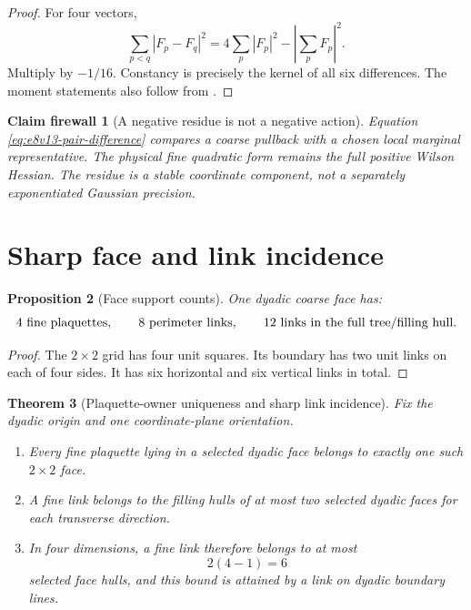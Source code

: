 \documentclass[11pt,oneside]{book}
\newtheorem{theorem}{Theorem}[chapter]
\newtheorem{proposition}[theorem]{Proposition}
\newtheorem{firewall}[theorem]{Claim firewall}
\theoremstyle{definition}
\theoremstyle{remark}
\begin{document}
\begin{proof}
For four vectors,
\[
 \sum_{p<q}|F_p-F_q|^2
 =4\sum_p|F_p|^2-\left|\sum_pF_p\right|^2.
\]
Multiply by \(-1/16\).  Constancy is precisely the kernel of all six
differences.  The moment statements also follow from
.
\end{proof}

\begin{firewall}[A negative residue is not a negative action]
\label{fire:e8v13-negative}
Equation \eqref{eq:e8v13-pair-difference} compares a coarse pullback
with a chosen local marginal representative.  The physical fine
quadratic form remains the full positive Wilson Hessian.  The residue
is a stable coordinate component, not a separately exponentiated
Gaussian precision.
\end{firewall}

\section{Sharp face and link incidence}
\label{sec:e8v13-incidence}

\begin{proposition}[Face support counts]
\label{prop:e8v13-face-counts}
One dyadic coarse face has:
\[
 4\ \hbox{fine plaquettes},\qquad
 8\ \hbox{perimeter links},\qquad
 12\ \hbox{links in the full tree/filling hull}.    \label{eq:e8v13-face-counts}
\]
\end{proposition}

\begin{proof}
The \(2\times2\) grid has four unit squares.  Its boundary has two
unit links on each of four sides.  It has six horizontal and six
vertical links in total.
\end{proof}

\begin{theorem}[Plaquette-owner uniqueness and sharp link incidence]
\label{thm:e8v13-incidence}
Fix the dyadic origin and one coordinate-plane orientation.
\begin{enumerate}[label=\textup{(\roman*)},leftmargin=3.5em]
\item Every fine plaquette lying in a selected dyadic face belongs to
      exactly one such \(2\times2\) face.
\item A fine link belongs to the filling hulls of at most two selected
      dyadic faces for each transverse direction.
\item In four dimensions, a fine link therefore belongs to at most
      \[
      2(4-1)=6                                      \label{eq:e8v13-link-six}
      \]
      selected face hulls, and this bound is attained by a link on
      dyadic boundary lines.
\end{enumerate}
\end{theorem}
\end{document}
